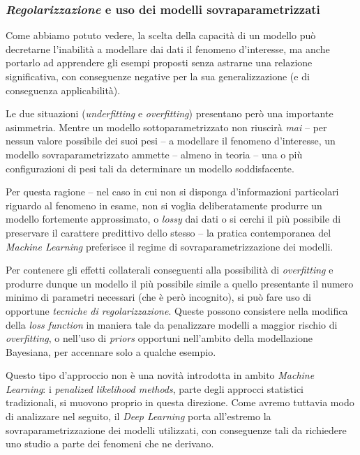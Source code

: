 \documentclass[a4paper, twoside]{article}
\begin{document}
\subsubsection{\textit{Regolarizzazione} e uso dei modelli sovraparametrizzati}

Come abbiamo potuto vedere, la scelta della capacità di un modello può decretarne l'inabilità a modellare dai dati il fenomeno d'interesse, ma anche portarlo ad apprendere gli esempi proposti senza astrarne una relazione significativa, con conseguenze negative per la sua generalizzazione (e di conseguenza applicabilità).

Le due situazioni (\textit{underfitting} e \textit{overfitting}) presentano però una importante asimmetria. Mentre un modello sottoparametrizzato non riuscirà \textit{mai} -- per nessun valore possibile dei suoi pesi -- a modellare il fenomeno d'interesse, un modello sovraparametrizzato ammette -- almeno in teoria -- una o più configurazioni di pesi tali da determinare un modello soddisfacente.

Per questa ragione -- nel caso in cui non si disponga d'informazioni particolari riguardo al fenomeno in esame, non si voglia deliberatamente produrre un modello fortemente approssimato, o \textit{lossy} dai dati o si cerchi il più possibile di preservare il carattere predittivo dello stesso -- la pratica contemporanea del \textit{Machine Learning} preferisce il regime di sovraparametrizzazione dei modelli.

Per contenere gli effetti collaterali conseguenti alla possibilità di \textit{overfitting} e produrre dunque un modello il più possibile simile a quello presentante il numero minimo di parametri necessari (che è però incognito), si può fare uso di opportune \textit{tecniche di regolarizzazione}. Queste possono consistere nella modifica della \textit{loss function} in maniera tale da penalizzare modelli a maggior rischio di \textit{overfitting}, o nell'uso di \textit{priors} opportuni nell'ambito della modellazione Bayesiana, per accennare solo a qualche esempio.

Questo tipo d'approccio non è una novità introdotta in ambito \textit{Machine Learning}: i \textit{penalized likelihood methods}, parte degli approcci statistici tradizionali, si muovono proprio in questa direzione. Come avremo tuttavia modo di analizzare nel seguito, il \textit{Deep Learning} porta all'estremo la sovraparametrizzazione dei modelli utilizzati, con conseguenze tali da richiedere uno studio a parte dei fenomeni che ne derivano.
\end{document}
